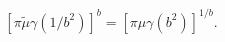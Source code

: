 \begin{equation}
\label{mu_dual}
\left\lbrack \pi\tilde\mu \gamma\left(1/b^2\right)
\right\rbrack^b
= 
\left\lbrack \pi\mu \gamma\left(b^2\right)
\right\rbrack^{1/b}.
\end{equation}

